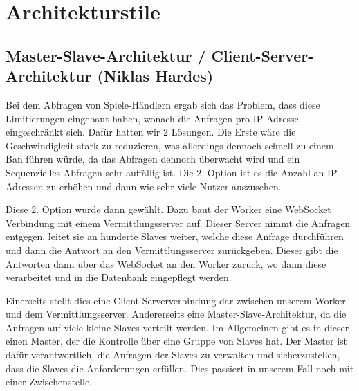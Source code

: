 
\section{Architekturstile}

\subsection*{Master-Slave-Architektur / Client-Server-Architektur (Niklas Hardes)}

Bei dem Abfragen von Spiele-Händlern ergab sich das Problem, dass diese Limitierungen eingebaut haben, wonach die Anfragen pro IP-Adresse eingeschränkt sich. Dafür hatten wir 2 Lösungen. Die Erste wäre die Geschwindigkeit stark zu reduzieren, was allerdings dennoch schnell zu einem Ban führen würde, da das Abfragen dennoch überwacht wird und ein Sequenzielles Abfragen sehr auffällig ist.
Die 2. Option ist es die Anzahl an IP-Adressen zu erhöhen und dann wie sehr viele Nutzer auszusehen.

Diese 2. Option wurde dann gewählt. Dazu baut der Worker eine WebSocket Verbindung mit einem Vermittlungsserver auf. Dieser Server nimmt die Anfragen entgegen, leitet sie an hunderte Slaves weiter, welche diese Anfrage durchführen und dann die Antwort an den Vermittlungsserver zurückgeben.
Dieser gibt die Antworten dann über das WebSocket an den Worker zurück, wo dann diese verarbeitet und in die Datenbank eingepflegt werden.

Einerseits stellt dies eine Client-Serververbindung dar zwischen unserem Worker und dem Vermittlungsserver. Andererseits eine Master-Slave-Architektur, da die Anfragen auf viele kleine Slaves verteilt werden. Im Allgemeinen gibt es in dieser einen Master, der die Kontrolle über eine Gruppe von Slaves hat. Der Master ist dafür verantwortlich, die Anfragen der Slaves zu verwalten und sicherzustellen, dass die Slaves die Anforderungen erfüllen. Dies passiert in unserem Fall noch mit einer Zwischenstelle.